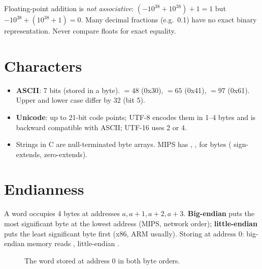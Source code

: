 \begin{important}[Pitfalls]
Floating-point addition is \emph{not associative}:
$(-10^{38} + 10^{38}) + 1 = 1$ but $-10^{38} + (10^{38} + 1) = 0$.
Many decimal fractions (e.g.\ 0.1) have no exact binary representation.
Never compare floats for exact equality.
\end{important}

\section{Characters}

\begin{itemize}
  \item \textbf{ASCII}: 7 bits (stored in a byte).  $= 48$
    (0x30),  $= 65$ (0x41),  $= 97$ (0x61). Upper and
    lower case differ by 32 (bit 5).
  \item \textbf{Unicode}: up to 21-bit code points; UTF-8 encodes them in
    1--4 bytes and is backward compatible with ASCII; UTF-16 uses 2 or 4.
  \item Strings in C are null-terminated byte arrays. MIPS has ,
    ,  for bytes ( sign-extends, 
    zero-extends).
\end{itemize}

\section{Endianness}

A word occupies 4 bytes at addresses $a, a+1, a+2, a+3$.
\textbf{Big-endian} puts the most significant byte at the lowest address
(MIPS, network order); \textbf{little-endian} puts the least significant
byte first (x86, ARM usually). Storing  at address 0:
big-endian memory reads , little-endian
.

\begin{figure}[H]
\centering
{}
\caption{The word  stored at address 0 in both byte orders.}
\end{figure}

